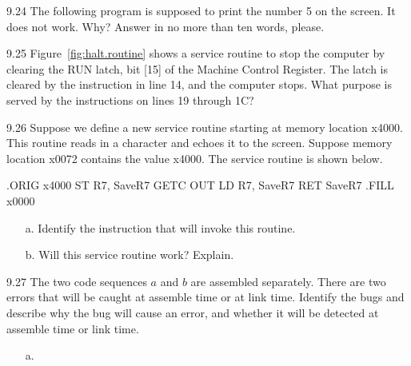 \documentclass{patt}
\begin{document}
\begin{exercises}
\item[9.24] The following program is supposed to print the number 5 on the
screen. It does not work. Why? Answer in no more than ten words, please.


\item[9.25] Figure~\ref{fig:halt.routine} shows a service routine to
stop the computer by clearing the RUN latch, bit [15] of the Machine
Control Register.  The latch is cleared by the instruction in line 14,
and the computer stops.  What purpose is served by the instructions on
lines 19 through 1C?

\item[9.26] Suppose we define a new service routine starting at memory location
x4000. This routine reads in a character and echoes it to the
screen. Suppose memory location x0072 contains the value x4000. The
service routine is shown below.

\begin{colorverbatim}
                .ORIG x4000
                ST R7, SaveR7
                GETC
                OUT
                LD R7, SaveR7
                RET
        SaveR7  .FILL x0000
\end{colorverbatim}

\begin{enumerate}[a.]
\item[a.] Identify the instruction that will invoke this routine.
\item[b.] Will this service routine work? Explain.
\end{enumerate}

\item[9.27] The two code sequences $a$ and $b$ are assembled
  separately. There are two errors that will be caught at assemble
  time or at link time. Identify the bugs and describe why the bug
  will cause an error, and whether it will be detected at assemble 
  time or link time.

\begin{enumerate}[a.]
\item[a.]


\end{enumerate}
\end{exercises}
\end{document}

